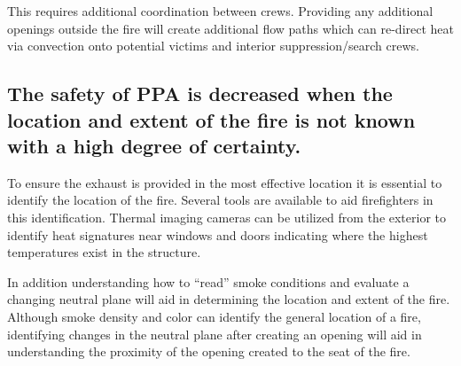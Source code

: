 \documentclass{article}
\begin{document}
This requires additional coordination between crews. Providing any additional openings outside the fire will create additional flow paths which can re-direct heat via convection onto potential victims and interior suppression/search crews. 

\subsection{The safety of PPA is decreased when the location and extent of the fire is not known with a high degree of certainty.}
To ensure the exhaust is provided in the most effective location it is essential to identify the location of the fire. Several tools are available to aid firefighters in this identification. Thermal imaging cameras can be utilized from the exterior to identify heat signatures near windows and doors indicating where the highest temperatures exist in the structure. 

In addition understanding how to ``read'' smoke conditions and evaluate a changing neutral plane will aid in determining the location and extent of the fire. Although smoke density and color can identify the general location of a fire, identifying changes in the neutral plane after creating an opening will aid in understanding the proximity of the opening created to the seat of the fire. 
\end{document}
